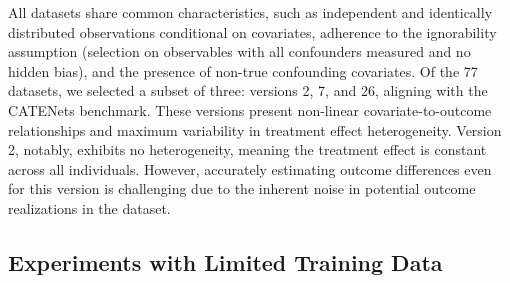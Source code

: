All datasets share common characteristics, such as independent and identically distributed observations conditional on covariates, adherence to the ignorability assumption (selection on observables with all confounders measured and no hidden bias), and the presence of non-true confounding covariates. Of the 77 datasets, we selected a subset of three: versions 2, 7, and 26, aligning with the CATENets benchmark. These versions present non-linear covariate-to-outcome relationships and maximum variability in treatment effect heterogeneity. Version 2, notably, exhibits no heterogeneity, meaning the treatment effect is constant across all individuals. However, accurately estimating outcome differences even for this version is challenging due to the inherent noise in potential outcome realizations in the dataset.


\subsection{Experiments with Limited Training Data}

